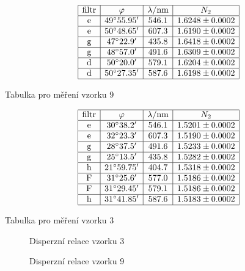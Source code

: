 \documentclass[a4paper,12pt]{article}
\begin{document}
\begin{table}
$$
\begin{array}{|c|c|c|c|}
\hline
\mbox{filtr}&   \varphi&    \lambda/\mbox{nm}&  N_2 \\ \hline
\mbox{e}&   49^{\circ} 55.95'&   546.1&  1.6248 \pm 0.0002 \\ \hline
\mbox{e}&   50^{\circ} 48.65'&   607.3&  1.6190 \pm 0.0002 \\ \hline
\mbox{g}&   47^{\circ} 22.9'&    435.8&  1.6418 \pm 0.0002 \\ \hline
\mbox{g}&   48^{\circ} 57.0'&    491.6&  1.6309 \pm 0.0002 \\ \hline
\mbox{d}& 50^{\circ} 20.0'&    579.1&  1.6204 \pm 0.0002 \\ \hline
\mbox{d}&   50^{\circ} 27.35'&   587.6&  1.6198 \pm 0.0002 \\ \hline
\end{array}
$$
\caption{Tabulka pro měření vzorku 9}
\label{T9}
\end{table}

\begin{table}
$$
\begin{array}{|c|c|c|c|}
\hline
\mbox{filtr}&   \varphi&    \lambda/\mbox{nm}&  N_2 \\ \hline
\mbox{e}&   30^{\circ} 38.2'&   546.1&  1.5201 \pm 0.0002 \\ \hline
\mbox{e}&   32^{\circ} 23.3'&   607.3&  1.5190 \pm 0.0002 \\ \hline
\mbox{g}&   28^{\circ} 37.5'&    491.6&  1.5233 \pm 0.0002 \\ \hline
\mbox{g}&   25^{\circ} 13.5'&    435.8&  1.5282 \pm 0.0002 \\ \hline
\mbox{h}& 21^{\circ} 59.75'&    404.7&  1.5318 \pm 0.0002 \\ \hline
\mbox{F}&    31^{\circ} 25.6'&    577.0&  1.5186 \pm 0.0002 \\ \hline
\mbox{F}&   31^{\circ} 29.45'&   579.1&  1.5186 \pm 0.0002 \\ \hline
\mbox{h}&   31^{\circ} 41.85'&   587.6&  1.5183 \pm 0.0002 \\ \hline
\end{array}
$$
\caption{Tabulka pro měření vzorku 3}
\label{T3}
\end{table}

\begin{figure}

\caption{Disperzní relace vzorku 3}
\label{G3}
\end{figure}

\begin{figure}

\caption{Disperzní relace vzorku 9}
\label{G9}
\end{figure}
\end{document}
